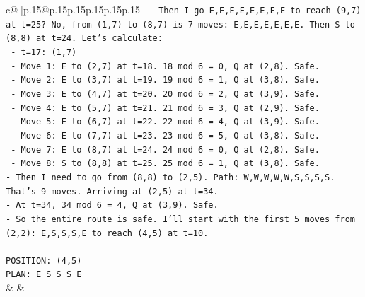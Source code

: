 \documentclass{article}
\begin{document}
{\begin{supertabular}{c@{$\;$}|p{.15\linewidth}@{}p{.15\linewidth}p{.15\linewidth}p{.15\linewidth}p{.15\linewidth}p{.15\linewidth}}
{{{\texttt{  {-} Then I go E,E,E,E,E,E,E,E to reach (9,7) at t=25? No, from (1,7) to (8,7) is 7 moves: E,E,E,E,E,E,E. Then S to (8,8) at t=24. Let's calculate: } \\
\texttt{    {-} t=17: (1,7)} \\
\texttt{    {-} Move 1: E to (2,7) at t=18. 18 mod 6 = 0, Q at (2,8). Safe.} \\
\texttt{    {-} Move 2: E to (3,7) at t=19. 19 mod 6 = 1, Q at (3,8). Safe.} \\
\texttt{    {-} Move 3: E to (4,7) at t=20. 20 mod 6 = 2, Q at (3,9). Safe.} \\
\texttt{    {-} Move 4: E to (5,7) at t=21. 21 mod 6 = 3, Q at (2,9). Safe.} \\
\texttt{    {-} Move 5: E to (6,7) at t=22. 22 mod 6 = 4, Q at (3,9). Safe.} \\
\texttt{    {-} Move 6: E to (7,7) at t=23. 23 mod 6 = 5, Q at (3,8). Safe.} \\
\texttt{    {-} Move 7: E to (8,7) at t=24. 24 mod 6 = 0, Q at (2,8). Safe.} \\
\texttt{    {-} Move 8: S to (8,8) at t=25. 25 mod 6 = 1, Q at (3,8). Safe.} \\
\texttt{{-} Then I need to go from (8,8) to (2,5). Path: W,W,W,W,W,S,S,S,S. That's 9 moves. Arriving at (2,5) at t=34.} \\
\texttt{{-} At t=34, 34 mod 6 = 4, Q at (3,9). Safe.} \\
\texttt{{-} So the entire route is safe. I'll start with the first 5 moves from (2,2): E,S,S,S,E to reach (4,5) at t=10.} \\
\\ 
\texttt{POSITION: (4,5)} \\
\texttt{PLAN: E S S S E} \\
            }
        }
    }
    & & \\ \\


\end{supertabular}}
\end{document}

